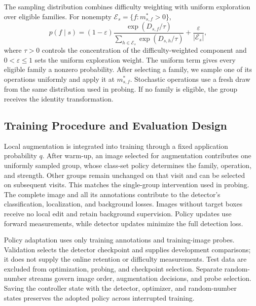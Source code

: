 \documentclass[conference]{IEEEtran}
\begin{document}
The sampling distribution combines difficulty weighting with uniform exploration over eligible families. For nonempty $\mathcal{E}_s=\{f:m^*_{s,f}>0\}$,
\begin{equation}
 p(f\mid s)=(1-\varepsilon)
 \frac{\exp(D_{s,f}/\tau)}
      {\sum_{h\in\mathcal{E}_s}\exp(D_{s,h}/\tau)}
 +\frac{\varepsilon}{|\mathcal{E}_s|},
 \label{eq:family_probability}
\end{equation}
where $\tau>0$ controls the concentration of the difficulty-weighted component and $0<\varepsilon\leq1$ sets the uniform exploration weight. The uniform term gives every eligible family a nonzero probability. After selecting a family, we sample one of its operations uniformly and apply it at $m^*_{s,f}$. Stochastic operations use a fresh draw from the same distribution used in probing. If no family is eligible, the group receives the identity transformation.

\subsection{Training Procedure and Evaluation Design}
\label{sec:method_evaluation}
Local augmentation is integrated into training through a fixed application probability $q$. After warm-up, an image selected for augmentation contributes one uniformly sampled group, whose class-set policy determines the family, operation, and strength. Other groups remain unchanged on that visit and can be selected on subsequent visits. This matches the single-group intervention used in probing. The complete image and all its annotations contribute to the detector's classification, localization, and background losses. Images without target boxes receive no local edit and retain background supervision. Policy updates use forward measurements, while detector updates minimize the full detection loss.

Policy adaptation uses only training annotations and training-image probes. Validation selects the detector checkpoint and supplies development comparisons; it does not supply the online retention or difficulty measurements. Test data are excluded from optimization, probing, and checkpoint selection. Separate random-number streams govern image order, augmentation decisions, and probe selection. Saving the controller state with the detector, optimizer, and random-number states preserves the adopted policy across interrupted training.
\end{document}

